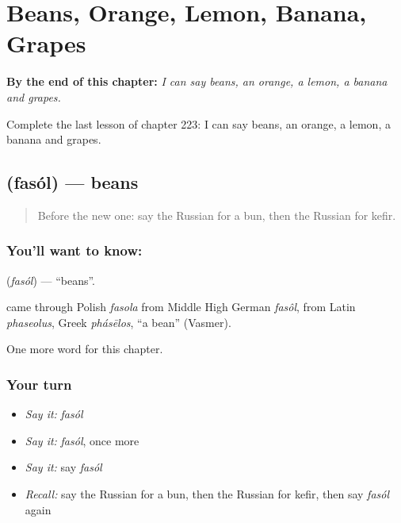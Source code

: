 
\chapter{Beans, Orange, Lemon, Banana, Grapes}
\label{ch:ru-beans-orange-lemon-banana-grapes}

\begin{chapteropening}
\textbf{By the end of this chapter:} \emph{I can say beans, an orange, a lemon, a banana and grapes.}

Complete the last lesson of chapter 223: I can say beans, an orange, a lemon, a banana and grapes.
\end{chapteropening}

\section[\texorpdfstring{\ru{фасоль} (fasól)}{фасоль (fasól)}]{ (fasól) — beans}

\label{lesson:RU-C223-fasol}



\begin{quote}
Before the new one: say the Russian for a bun, then the Russian for kefir.
\end{quote}

\subsection*{You'll want to know: }
\textbf{} (\emph{fasól}) — \textquotedblleft{}beans\textquotedblright{}.

\begin{cousinweb}
\textbf{} came through Polish \emph{fasola} from Middle High German \emph{fasôl}, from Latin \emph{phaseolus}, Greek \emph{phásēlos}, \textquotedblleft{}a bean\textquotedblright{} (Vasmer).
\end{cousinweb}

\begin{grammarlens}[title={What you've built}]
One more word for this chapter.
\end{grammarlens}

\subsection*{Your turn}
\begin{itemize}
\raggedright
  \item \emph{Say it:} \emph{fasól}
  \item \emph{Say it:} \emph{fasól}, once more
  \item \emph{Say it:} say \emph{fasól}
  \item \emph{Recall:} say the Russian for a bun, then the Russian for kefir, then say \emph{fasól} again
\end{itemize}

